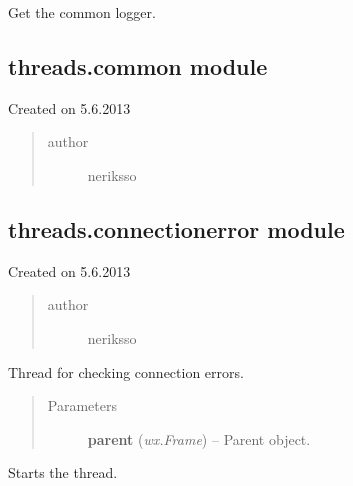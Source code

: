 \documentclass[letterpaper,10pt,english]{sphinxmanual}
\begin{document}

\begin{fulllineitems}
\label{threads:threads.checkupdate.logger}
Get the common logger.

\end{fulllineitems}



\subsection{threads.common module}
\label{threads:module-threads.common}\label{threads:threads-common-module}
Created on 5.6.2013
\begin{quote}\begin{description}
\item[{author}] \leavevmode
neriksso

\end{description}\end{quote}


\subsection{threads.connectionerror module}
\label{threads:threads-connectionerror-module}\label{threads:module-threads.connectionerror}
Created on 5.6.2013
\begin{quote}\begin{description}
\item[{author}] \leavevmode
neriksso

\end{description}\end{quote}

\begin{fulllineitems}
\label{threads:threads.connectionerror.CONNECTION_ERROR_THREAD}
Thread for checking connection errors.
\begin{quote}\begin{description}
\item[{Parameters}] \leavevmode
\textbf{parent} (\emph{wx.Frame}) -- Parent object.

\end{description}\end{quote}

\begin{fulllineitems}
\label{threads:threads.connectionerror.CONNECTION_ERROR_THREAD.run}
Starts the thread.

\end{fulllineitems}


\end{fulllineitems}
\end{document}
